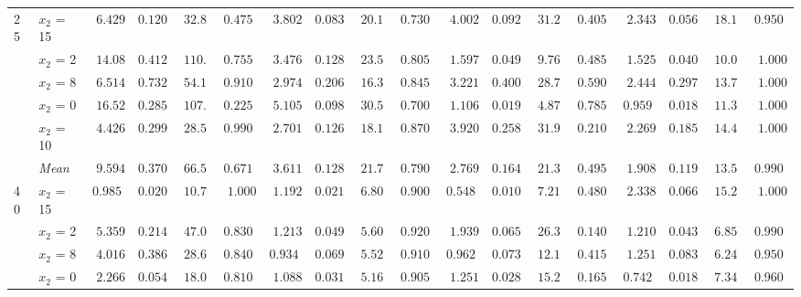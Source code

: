 \begin{table}[htbp]
\begin{tabular}{llrrrrrrrrrrrrrrrr}
\midrule
\multirow{6}{*}{25} & $x_2$ = 15 & $6.429$ & $0.1209$ & $32.81$ & $0.4750$ & $3.802$ & $0.0830$ & $20.12$ & $0.7300$ & $4.002$ & $0.0929$ & $31.27$ & $0.4050$ & {\boldmath$2.343$} & {\boldmath$0.0560$} & {\boldmath$18.15$} & {\boldmath$0.9500$} \\
 & $x_2$ = 2 & $14.08$ & $0.4128$ & $110.2$ & $0.7550$ & $3.476$ & $0.1285$ & $23.53$ & {\boldmath$0.8050$} & $1.597$ & $0.0492$ & {\boldmath$9.762$} & $0.4850$ & {\boldmath$1.525$} & {\boldmath$0.0405$} & $10.01$ & $1.000$ \\
 & $x_2$ = 8 & $6.514$ & $0.7329$ & $54.17$ & {\boldmath$0.9100$} & $2.974$ & {\boldmath$0.2068$} & $16.39$ & $0.8450$ & $3.221$ & $0.4004$ & $28.72$ & $0.5900$ & {\boldmath$2.444$} & $0.2976$ & {\boldmath$13.77$} & $1.000$ \\
 & $x_2$ = 0 & $16.52$ & $0.2858$ & $107.1$ & $0.2250$ & $5.105$ & $0.0989$ & $30.53$ & $0.7000$ & $1.106$ & $0.0195$ & {\boldmath$4.871$} & $0.7850$ & {\boldmath$0.9591$} & {\boldmath$0.0184$} & $11.34$ & {\boldmath$1.000$} \\
 & $x_2$ = 10 & $4.426$ & $0.2995$ & $28.59$ & $0.9900$ & $2.701$ & {\boldmath$0.1266$} & $18.15$ & {\boldmath$0.8700$} & $3.920$ & $0.2585$ & $31.95$ & $0.2100$ & {\boldmath$2.269$} & $0.1855$ & {\boldmath$14.47$} & $1.000$ \\
 & \textit{Mean} & $9.594$ & $0.3704$ & $66.56$ & $0.6710$ & $3.611$ & $0.1288$ & $21.75$ & $0.7900$ & $2.769$ & $0.1641$ & $21.31$ & $0.4950$ & \colorbox{green!20}{\boldmath$1.908$} & \colorbox{green!20}{\boldmath$0.1196$} & \colorbox{green!20}{\boldmath$13.55$} & \colorbox{green!20}{\boldmath$0.9900$} \\
\midrule
\multirow{6}{*}{40} & $x_2$ = 15 & $0.9852$ & $0.0209$ & $10.74$ & $1.000$ & $1.192$ & $0.0215$ & {\boldmath$6.805$} & {\boldmath$0.9000$} & {\boldmath$0.5486$} & {\boldmath$0.0107$} & $7.218$ & $0.4800$ & $2.338$ & $0.0661$ & $15.22$ & $1.000$ \\
 & $x_2$ = 2 & $5.359$ & $0.2146$ & $47.05$ & $0.8300$ & $1.213$ & $0.0495$ & {\boldmath$5.608$} & {\boldmath$0.9200$} & $1.939$ & $0.0650$ & $26.36$ & $0.1400$ & {\boldmath$1.210$} & {\boldmath$0.0435$} & $6.854$ & $0.9900$ \\
 & $x_2$ = 8 & $4.016$ & $0.3868$ & $28.61$ & $0.8400$ & {\boldmath$0.9340$} & {\boldmath$0.0695$} & {\boldmath$5.523$} & {\boldmath$0.9100$} & $0.9620$ & $0.0730$ & $12.12$ & $0.4150$ & $1.251$ & $0.0835$ & $6.249$ & $0.9500$ \\
 & $x_2$ = 0 & $2.266$ & $0.0545$ & $18.01$ & $0.8100$ & $1.088$ & $0.0316$ & {\boldmath$5.163$} & {\boldmath$0.9050$} & $1.251$ & $0.0288$ & $15.29$ & $0.1650$ & {\boldmath$0.7429$} & {\boldmath$0.0183$} & $7.344$ & $0.9600$ \\

\end{tabular}
\end{table}
